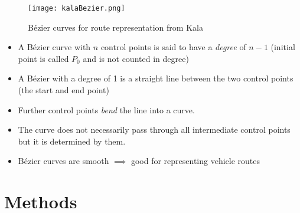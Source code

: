 \documentclass{beamer}
\begin{document}
\begin{frame}

    \begin{figure}[KalaBezier]
        \centering
        \texttt{[image: kalaBezier.png]}
        \caption{Bézier curves for route representation from Kala \cite{kalaOnroadIntelligentVehicles2016}}%
        \label{fig:.ext}
    \end{figure}

    \begin{itemize}
        \item A Bézier curve with $n$ control points is said to have a \textit{degree} of $n-1$ (initial point is called $P_0$ and is not counted in degree)
        \item A Bézier with a degree of 1 is a straight line between the two control points (the start and end point)
        \item Further control points \textit{bend} the line into a curve.
        \item The curve does not necessarily pass through all intermediate control points but it is determined by them.
        \item Bézier curves are smooth $\implies$ good for representing vehicle routes
    \end{itemize}
\end{frame}
\section{Methods}
\end{document}
